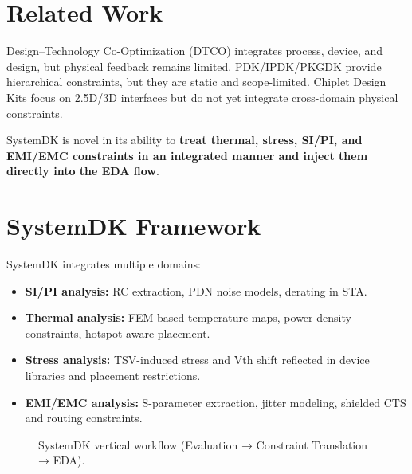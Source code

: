 \documentclass[conference]{IEEEtran}
\begin{document}
\section{Related Work}
Design--Technology Co-Optimization (DTCO) integrates process, device, and design, but physical feedback remains limited.
PDK/IPDK/PKGDK provide hierarchical constraints, but they are static and scope-limited.
Chiplet Design Kits focus on 2.5D/3D interfaces but do not yet integrate cross-domain physical constraints.

SystemDK is novel in its ability to \textbf{treat thermal, stress, SI/PI, and EMI/EMC constraints in an integrated manner and inject them directly into the EDA flow}.

\section{SystemDK Framework}
SystemDK integrates multiple domains:
\begin{itemize}
  \item \textbf{SI/PI analysis:} RC extraction, PDN noise models, derating in STA.
  \item \textbf{Thermal analysis:} FEM-based temperature maps, power-density constraints, hotspot-aware placement.
  \item \textbf{Stress analysis:} TSV-induced stress and Vth shift reflected in device libraries and placement restrictions.
  \item \textbf{EMI/EMC analysis:} S-parameter extraction, jitter modeling, shielded CTS and routing constraints.
\end{itemize}

\begin{figure}[htbp]
  \centering
  \caption{SystemDK vertical workflow (Evaluation → Constraint Translation → EDA).}
  \label{fig:framework}
\end{figure}
\end{document}
